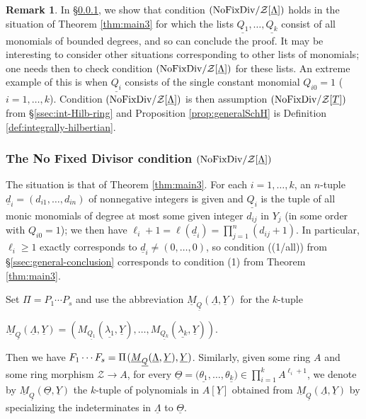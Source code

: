\documentclass[11pt,a4paper,reqno]{amsart}
\theoremstyle{definition}
\newtheorem{rmk}[thm]{Remark}
\begin{document}
\begin{rmk} \label{rmk:momomials-vs-general}
In \S \ref{sssec:no-fixed-divisor}, we show that condition $\hbox{\rm (NoFixDiv}/{\mathcal Z}[\underline \Lambda])$ holds in the situation of Theorem \ref{thm:main3} for which the lists $\underline{Q_1},\ldots, \underline{Q_k}$ consist of all monomials of bounded degrees, and so can conclude the proof.
It may be interesting to consider other situations corresponding to other lists of monomials; one needs then to check condition $\hbox{\rm (NoFixDiv}/{\mathcal Z}[\underline \Lambda])$ for these lists. An extreme example of this is when $\underline{Q_i}$ consists of the single constant monomial $Q_{i0}=1$ ($i=1,\ldots,k$). Condition  $\hbox{\rm (NoFixDiv}/{\mathcal Z}[\underline \Lambda])$ is then assumption $\hbox{\rm (NoFixDiv}/{\mathcal Z}[\underline T])$ from \S \ref{ssec:int-Hilb-ring} and Proposition \ref{prop:generalSchH} is Definition \ref{def:integrally-hilbertian}.
\end{rmk}



\subsubsection{The No Fixed Divisor condition $\hbox{\rm (NoFixDiv}/{\mathcal Z}[\underline \Lambda])$}
\label{sssec:no-fixed-divisor}
The situation is that of Theorem \ref{thm:main3}. For each $i=1,\ldots,k$, an $n$-tuple ${\underline d}_i=(d_{i1},\ldots,d_{in})$ of nonnegative integers is given and $\underline{Q_i}$ is the tuple of all monic monomials of degree at most some given integer $d_{ij}$ in $Y_j$ (in some order with $Q_{i0}=1$);
we then have $\ell_i+1 = \ell(\underline d_i)=  \prod_{j=1}^n (d_{ij}+1)$. In particular, $\ell_i \geq 1$ exactly corresponds to $\underline d_i\not= (0,\ldots,0)$, so condition {\rm ((1/{\rm all}))} from \S \ref{ssec:general-conclusion} corresponds to condition (1) from Theorem \ref{thm:main3}.


Set $\Pi = P_1 \cdots P_s$ and use the abbreviation 
$\underline M_{\underline Q}( \underline{\Lambda},\underline Y)$ for the $k$-tuple 
\vskip 2mm
\centerline{$\underline M_{\underline Q}( \underline{\Lambda},\underline Y)=(M_{\underline {Q_1}}({\underline{\lambda_1}}, \underline Y), \ldots, M_{\underline {Q_k}}({\underline{\lambda_k}}, \underline Y))$.}
\vskip 2mm

\noindent
Then we have $F_1\cdots F_s= \Pi\hskip 1pt (\underline M_{\underline Q}(\underline{\Lambda},\underline Y),\underline Y)$. Similarly, given some ring $A$ and some ring morphism ${\mathcal Z}\rightarrow A$, for every $\underline{\Theta}=(\underline{\theta_1},\ldots,\underline{\theta_k)}\in \prod_{i=1}^k A^{\ell_i+1}$, we denote by $\underline M_{\underline Q}( \underline{\Theta},\underline Y)$ the $k$-tuple of polynomials in $A[\underline Y]$ obtained from $\underline M_{\underline Q}( \underline{\Lambda},\underline Y)$ by specializing the indeterminates in $\underline{\Lambda}$ to $\underline{\Theta}$.
\end{document}
